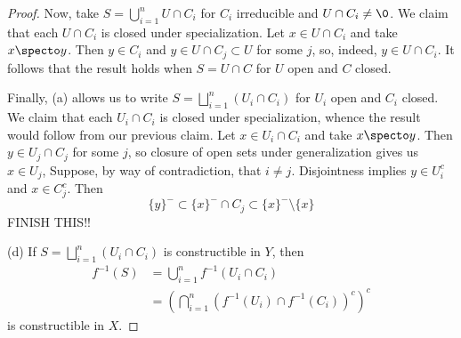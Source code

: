 \documentclass[12pt]{amsart}
\begin{document}
\begin{proof}
  Now, take $S=\bigcup_{i=1}^n U\cap C_i$ for $C_i$ irreducible and $U\cap C_i\neq \0$.
  We claim that each $U\cap C_i$ is closed under specialization.
  Let $x\in U\cap C_i$ and take $x\specto y$.
  Then $y\in C_i$ and $y\in U\cap C_j\subset U$ for some $j$, so, indeed, $y\in U\cap C_i$.
  It follows that the result holds when $S=U\cap C$ for $U$ open and $C$ closed.

  Finally, (a) allows us to write $S=\bigsqcup_{i=1}^n(U_i\cap C_i)$ for $U_i$ open and $C_i$ closed.
  We claim that each $U_i\cap C_i$ is closed under specialization, whence the result would follow from our previous claim.
  Let $x\in U_i\cap C_i$ and take $x\specto y$.
  Then $y\in U_j\cap C_j$ for some $j$, so closure of open sets under generalization gives us $x\in U_j$, 
  Suppose, by way of contradiction, that $i\neq j$.
  Disjointness implies $y\in U_i^c$ and $x\in C_j^c$.
  Then 
  \[
    \{y\}^-\subset \{x\}^- \cap C_j\subset \{x\}^-\setminus \{x\}
  \]
  FINISH THIS!!
  
  (d) If $S=\bigsqcup_{i=1}^n(U_i\cap C_i)$ is constructible in $Y$, then
  \begin{align*}
    f^{-1}(S) &= \bigcup_{i=1}^n f^{-1}(U_i\cap C_i) \\
              &= \left(\bigcap_{i=1}^n (f^{-1}(U_i)\cap f^{-1}(C_i))^c\right)^c
  \end{align*}
  is constructible in $X$.
\end{proof}
\end{document}
